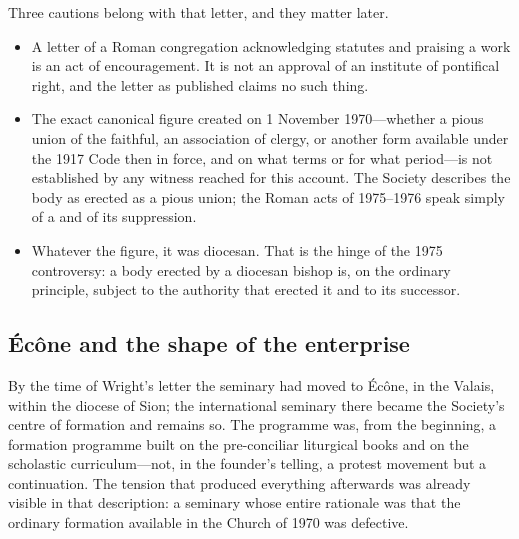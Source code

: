 Three cautions belong with that letter, and they matter later.

\begin{itemize}
\item A letter of a Roman congregation acknowledging statutes and
praising a work is an act of encouragement. It is not an approval of an
institute of pontifical right, and the letter as published claims no such
thing.
\item The exact canonical figure created on 1 November 1970---whether a
pious union of the faithful, an association of clergy, or another form
available under the 1917 Code then in force, and on what terms or for
what period---is not established by any witness reached for this account.
The Society describes the body as erected as a pious union; the Roman
acts of 1975--1976 speak simply of a  and of its
suppression.
\item Whatever the figure, it was diocesan. That is the hinge of the
1975 controversy: a body erected by a diocesan bishop is, on the ordinary
principle, subject to the authority that erected it and to its successor.
\end{itemize}


\subsection{Écône and the shape of the enterprise}

By the time of Wright's letter the seminary had moved to Écône, in the
Valais, within the diocese of Sion; the international seminary there
became the Society's centre of formation and remains so. The programme
was, from the beginning, a formation programme built on the pre-conciliar
liturgical books and on the scholastic curriculum---not, in the founder's
telling, a protest movement but a continuation. The tension that produced
everything afterwards was already visible in that description: a seminary
whose entire rationale was that the ordinary formation available in the
Church of 1970 was defective.

